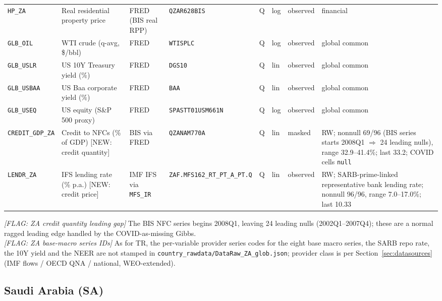 {\begin{longtable}{p{2.3cm}p{3.3cm}p{2.1cm}p{2.2cm}p{0.6cm}p{1.4cm}p{1.9cm}p{2.4cm}}
\texttt{HP\_ZA}     & Real residential property price    & FRED (BIS real RPP) & \texttt{QZAR628BIS} & Q & log & observed & financial \\
\texttt{GLB\_OIL}   & WTI crude (q-avg, \$/bbl)          & FRED & \texttt{WTISPLC} & Q & log & observed & global common \\
\texttt{GLB\_USLR}  & US 10Y Treasury yield (\%)         & FRED & \texttt{DGS10} & Q & lin & observed & global common \\
\texttt{GLB\_USBAA} & US Baa corporate yield (\%)        & FRED & \texttt{BAA} & Q & lin & observed & global common \\
\texttt{GLB\_USEQ}  & US equity (S\&P 500 proxy)         & FRED & \texttt{SPASTT01USM661N} & Q & log & observed & global common \\
\texttt{CREDIT\_GDP\_ZA} & Credit to NFCs (\% of GDP) [NEW: credit quantity] & BIS via FRED & \texttt{QZANAM770A} & Q & lin & masked & RW; nonnull 69/96 (BIS series starts 2008Q1 $\Rightarrow$ 24 leading nulls), range 32.9--41.4\%; last 33.2; COVID cells \texttt{null} \\
\texttt{LENDR\_ZA}  & IFS lending rate (\% p.a.) [NEW: credit price] & IMF IFS via \texttt{MFS\_IR} & \texttt{ZAF.\allowbreak MFS162\_RT\_PT\_A\_PT.\allowbreak Q} & Q & lin & observed & RW; SARB-prime-linked representative bank lending rate; nonnull 96/96, range 7.0--17.0\%; last 10.33 \\
\end{longtable}}

\noindent\textit{[FLAG: ZA credit quantity leading gap]} The BIS NFC series
begins 2008Q1, leaving 24 leading nulls (2002Q1--2007Q4); these are a normal
ragged leading edge handled by the COVID-as-missing Gibbs.\\
\textit{[FLAG: ZA base-macro series IDs]} As for TR, the per-variable provider
series codes for the eight base macro series, the SARB repo rate, the 10Y yield
and the NEER are not stamped in
\texttt{country\_rawdata/DataRaw\_ZA\_glob.json}; provider class is per
Section~\ref{sec:datasources} (IMF flows / OECD QNA / national, WEO-extended).

\subsection{Saudi Arabia (SA)}\label{sec:data:SA}

